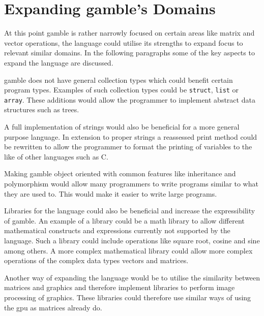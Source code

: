 \section{Expanding \gls{gamble}'s Domains}
At this point \gls{gamble} is rather narrowly focused on certain areas like matrix and vector operations, the language could utilise its strengths to expand focus to relevant similar domains.
In the following paragraphs some of the key aspects to expand the language are discussed.

\gls{gamble} does not have general collection types which could benefit certain program types.
Examples of such collection types could be \texttt{struct}, \texttt{list} or \texttt{array}.
These additions would allow the programmer to implement abstract data structures such as trees.

A full implementation of strings would also be beneficial for a more general purpose language.
In extension to proper strings a reassessed print method could be rewritten to allow the programmer to format the printing of variables to the like of other languages such as C.

Making \gls{gamble} object oriented with common features like inheritance and polymorphism would allow many programmers to write programs similar to what they are used to.
This would make it easier to write large programs.

Libraries for the language could also be beneficial and increase the expressibility of \gls{gamble}.
An example of a library could be a math library to allow different mathematical constructs and expressions currently not supported by the language.
Such a library could include operations like square root, cosine and sine among others.
A more complex mathematical library could allow more complex operations of the complex data types vectors and matrices.

Another way of expanding the language would be to utilise the similarity between matrices and graphics and therefore implement libraries to perform image processing of graphics.
These libraries could therefore use similar ways of using the \acrshort{gpu} as matrices already do.

